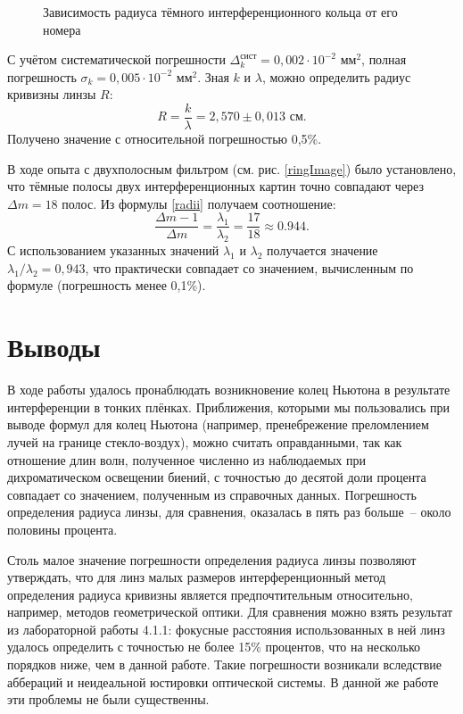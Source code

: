 \documentclass[a4paper,12pt]{article} %
\begin{document}
\begin{figure}[h] \label{graph}
\begin{center}
\caption{Зависимость радиуса тёмного интерференционного кольца от его номера}
\end{center}
\end{figure}

С учётом систематической погрешности $\Delta_k^\text{сист} = 0,002\cdot 10^{-2}$ мм$^2$, полная погрешность $\sigma_k = 0,005\cdot 10^{-2}$ мм$^2$.
Зная $k$ и $\lambda$, можно определить радиус кривизны линзы $R$:
$$
R = \frac{k}{\lambda} = 2,570 \pm 0,013 \text{ см}.
$$
Получено значение с относительной погрешностью 0,5\%.

В ходе опыта с двухполосным фильтром (см. рис. \ref{ringImage}) было установлено, что тёмные полосы двух интерференционных картин точно совпадают через $\Delta m = 18$ полос. Из формулы \eqref{radii} получаем соотношение:
$$
\frac{\Delta m - 1}{\Delta m} = \frac{\lambda_1}{\lambda_2} = \frac{17}{18} \approx 0.944.
$$
С использованием указанных значений $\lambda_1$ и $\lambda_2$ получается значение $\lambda_1/\lambda_2 = 0,943$, что практически совпадает со значением, вычисленным по формуле (погрешность менее 0,1\%).

\section{Выводы}
В ходе работы удалось пронаблюдать возникновение колец Ньютона в результате интерференции в тонких плёнках. Приближения, которыми мы пользовались при выводе формул для колец Ньютона (например, пренебрежение преломлением лучей на границе стекло-воздух), можно считать оправданными, так как отношение длин волн, полученное численно из наблюдаемых при дихроматическом освещении биений, с точностью до десятой доли процента совпадает со значением, полученным из справочных данных. Погрешность определения радиуса линзы, для сравнения, оказалась в пять раз больше~-- около половины процента.

Столь малое значение погрешности определения радиуса линзы позволяют утверждать, что для линз малых размеров интерференционный метод определения радиуса кривизны является предпочтительным относительно, например, методов геометрической оптики. Для сравнения можно взять результат из лабораторной работы 4.1.1: фокусные расстояния использованных в ней линз удалось определить с точностью не более 15\% процентов, что на несколько порядков ниже, чем в данной работе. Такие погрешности возникали вследствие аббераций и неидеальной юстировки оптической системы. В данной же работе эти проблемы не были существенны.
\end{document}
